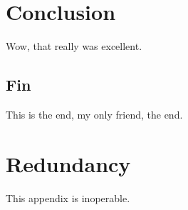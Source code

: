 \documentclass[onehalf,11pt]{beavtex}
\begin{document}
\chapter{Conclusion}
Wow, that really was excellent.
\section{Fin}
This is the end, my only friend, the end.







\appendix
\chapter{Redundancy}
This appendix is inoperable.
\end{document}
